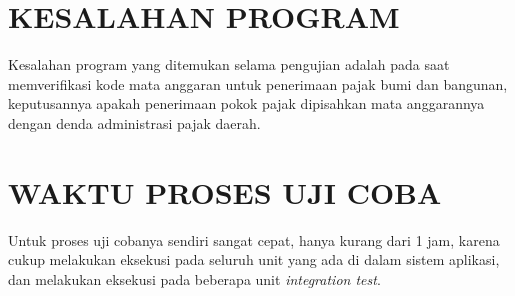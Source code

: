 \documentclass[pdftex,12pt, oneside]{article}
\begin{document}
\section{KESALAHAN PROGRAM}

Kesalahan program yang ditemukan selama pengujian adalah pada saat memverifikasi kode mata anggaran untuk penerimaan pajak bumi dan bangunan, keputusannya apakah penerimaan pokok pajak dipisahkan mata anggarannya dengan denda administrasi pajak daerah.


\section{WAKTU PROSES UJI COBA}

Untuk proses uji cobanya sendiri sangat cepat, hanya kurang dari 1 jam, karena cukup melakukan eksekusi pada seluruh unit yang ada di dalam sistem aplikasi, dan melakukan eksekusi pada beberapa unit \textit{integration test}.
\end{document}
